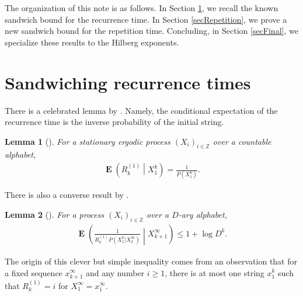 \documentclass[a4paper,12pt]{article}
\newcommand{\okra}[1]{\left( #1 \right)}
\DeclareMathOperator{\mean}{\mathbf{E}}
\newtheorem{lemma}{Lemma}
\begin{document}
The organization of this note is as follows. In Section
\ref{secRecurrence}, we recall the known sandwich bound for the
recurrence time. In Section \ref{secRepetition}, we prove a new
sandwich bound for the repetition time. Concluding, in Section
\ref{secFinal}, we specialize these results to the Hilberg exponents.




\section{Sandwiching recurrence times}
\label{secRecurrence}

There is a celebrated lemma by \citeauthor{Kac47}. Namely, the
conditional expectation of the recurrence time is the inverse
probability of the initial string.
\begin{lemma}[\citep{Kac47}]
  \label{theoKac}
  For a stationary ergodic process $(X_i)_{i\in\mathbb{Z}}$ over a
  countable alphabet,
  \begin{align}
    \mean\okra{R^{(1)}_k\middle|X_1^k}
    =
    \frac{1}{P(X_1^k)}.
  \end{align}
\end{lemma}
There is also a converse result by \citeauthor{Kontoyiannis98}.
\begin{lemma}[\citep{Kontoyiannis98}]
  \label{theoKontoyiannis}
  For a process $(X_i)_{i\in\mathbb{Z}}$ over a $D$-ary alphabet,
  \begin{align}
    \mean\okra{\frac{1}{R^{(1)}_k
    P(X_1^k|X_2^\infty)}\middle|X_{k+1}^\infty}
    \le
    1+\log D^k.
  \end{align}
\end{lemma}
The origin of this clever but simple inequality comes from an
observation that for a fixed sequence $x_{k+1}^\infty$ and any number
$i\ge 1$, there is at most one string $x_1^k$ such that $R^{(1)}_k=i$
for $X_1^\infty=x_1^\infty$.
\end{document}
